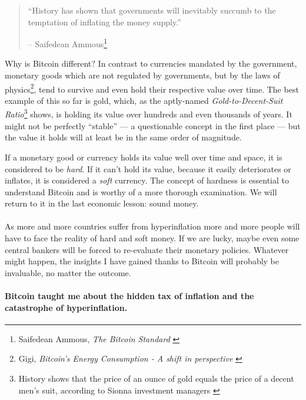 \begin{quotation}\begin{samepage}
\enquote{History has shown that governments will inevitably succumb to the
temptation of inflating the money supply.}
\begin{flushright} -- Saifedean Ammous\footnote{Saifedean Ammous, \textit{The Bitcoin
Standard} \cite{bitcoin-standard}}
\end{flushright}\end{samepage}\end{quotation}

\newpage

Why is Bitcoin different? In contrast to currencies mandated by the government,
monetary goods which are not regulated by governments, but by the laws of
physics\footnote{Gigi, \textit{Bitcoin's Energy Consumption - A shift in
perspective} \cite{gigi:energy}}, tend to survive and even hold their respective
value over time. The best example of this so far is gold, which, as the
aptly-named \textit{Gold-to-Decent-Suit Ratio}\footnote{History shows that the
price of an ounce of gold equals the price of a decent men's suit, according to Sionna
investment managers \cite{web:gold-to-decent-suite-ratio}} shows, is holding its
value over hundreds and even thousands of years. It might not be perfectly
\enquote{stable} --- a questionable concept in the first place --- but the value it
holds will at least be in the same order of magnitude.

If a monetary good or currency holds its value well over time and space,
it is considered to be \textit{hard}. If it can't hold its value, because it
easily deteriorates or inflates, it is considered a \textit{soft} currency. The
concept of hardness is essential to understand Bitcoin and is worthy of
a more thorough examination. We will return to it in the last economic
lesson: sound money.

\paragraph{}
As more and more countries suffer from
hyperinflation more and more people will have to face the reality
of hard and soft money. If we are lucky, maybe even some central bankers will be
forced to re-evaluate their monetary policies. Whatever might happen, the
insights I have gained thanks to Bitcoin will probably be invaluable, no matter
the outcome.

\paragraph{Bitcoin taught me about the hidden tax of inflation and the catastrophe
of hyperinflation.}

